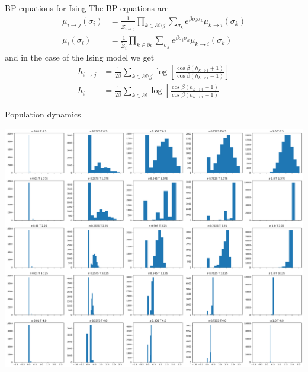 \documentclass[handout]{beamer}
\begin{document}
\begin{frame}{BP equations for Ising}
    The BP equations are
    \begin{align}
        \mu_{i\to j}(\sigma_i) &= \frac{1}{\tilde Z_{i\to j}} \prod_{k \in
        \partial i \setminus j} \sum_{\sigma_k} e^{\beta \sigma_i \sigma_k}
        \mu_{k\to i} (\sigma_k)\\
            \mu_i(\sigma_i) &= \frac{1}{\tilde Z_i} \prod_{k\in \partial i}
            \sum_{\sigma_k} e^{\beta \sigma_i \sigma_k} \mu_{k\to i} (\sigma_k)
    \end{align}
    and in the case of the Ising model we get
    \begin{align}
        h_{i\to j} &= \frac{1}{2\beta} \sum_{k\in \partial i \setminus j} \log
        \left[ \frac{\cos{\beta(h_{k\to i} +1)}}{\cos{\beta(h_{k\to i} -1)}}
        \right]\\
        h_{i} &= \frac{1}{2\beta} \sum_{k\in \partial i} \log
        \left[ \frac{\cos{\beta(h_{k\to i} +1)}}{\cos{\beta(h_{k\to i} -1)}} \right]
    \end{align}
\end{frame}

\begin{frame}{Population dynamics}
\end{frame}

\begin{frame}[plain]
    \includegraphics[width=.9\textwidth]{pd_cavity}
\end{frame}
\end{document}
